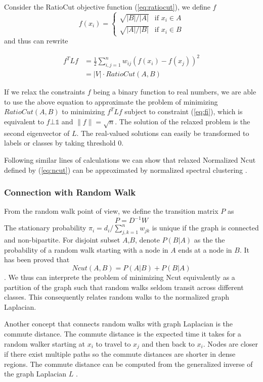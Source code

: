 Consider the RatioCut objective function (\ref{eq:ratiocut}), we define $f$    
\begin{equation}\label{eq:fi}  
f(x_i) = \left\{ \begin{array}{ll}
\sqrt{|B|/|A|} & \mbox{if }x_i \in A \\
\sqrt{|A|/|B|} & \mbox{if }x_i \in B \end{array} \right. \end{equation}
and thus can rewrite 

\begin{align} 
    f^TLf & = \frac{1}{2}\sum_{i,j=1}^{n}w_{ij}(f(x_i)-f(x_j))^2 \\
    &= |V|\cdot RatioCut(A, B)
\end{align}

If we relax the constraints $f$ being a binary function to real numbers, we are
able to use the above equation to approximate the problem of minimizing  $
RatioCut(A, B)$ to minimizing $ f^TLf$ subject to constraint (\ref{eq:fi}),
which is equivalent to $f \bot \mathbb{1}$ and $\|f\| = \sqrt{n}$. The solution
of the relaxed problem is the second eigenvector of $L$. The real-valued
solutions can easily be transformed to labels or classes by taking threshold $0$.

Following similar lines of calculations we can show that relaxed Normalized Ncut
defined by (\ref{eq:ncut}) can be approximated by normalized spectral
clustering \cite{shi}.

\subsubsection*{Connection with Random Walk}

From the random walk point of view, we define the transition matrix $P$ as
\[P = D^{-1}W\]
The stationary probability $\pi_i = d_i/\sum_{j,k=1}^{n} w_{jk}$ is unique if
the graph is connected and non-bipartite. For disjoint subset $A$,$ B$, denote
$P(B|A)$ as the the probability of a random walk starting with a node in $A$
ends at a node in $B$. It has been proved that \[Ncut(A, B) = P(A|B) + P(B|A)\].
We thus can interprete the problem of minimizing Ncut equivalently as a
partition of the graph such that random walks seldom transit across different
classes. This consequently relates random walks to the normalized graph
Laplacian.

Another concept that connects random walks with graph Laplacian is the commute
distance. The commute distance is the expected time it takes for a random walker
starting at $x_i$ to travel to $x_j$ and then back to $x_i$.  
Nodes are closer if there exist multiple
paths so the commute distances are shorter in dense regions. The commute
distance can be computed from the generalized inverse of the graph Laplacian
$L$ \cite{klein}. 

